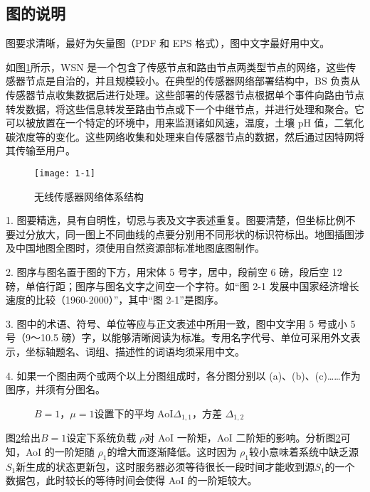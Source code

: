 \subsection{图的说明}

图要求清晰，最好为矢量图（PDF 和 EPS 格式），图中文字最好用中文。

如图\ref{Fig1-1}所示，WSN 是一个包含了传感节点和路由节点两类型节点的网络，这些传感器节点是自治的，并且规模较小。在典型的传感器网络部署结构中，BS 负责从传感器节点收集数据后进行处理。这些部署的传感器节点根据单个事件向路由节点转发数据，将这些信息转发至路由节点或下一个中继节点，并进行处理和聚合。它可以被放置在一个特定的环境中，用来监测诸如风速，温度，土壤 pH 值，二氧化碳浓度等的变化。这些网络收集和处理来自传感器节点的数据，然后通过因特网将其传输至用户。

\begin{figure}[htbp]
\vspace*{6pt}
\centering
\texttt{[image: 1-1]}
\caption{无线传感器网络体系结构}\label{Fig1-1}
\vspace*{10pt}
\end{figure}


\textcolor[rgb]{1.00,0.00,0.00}{1. 图要精选，具有自明性，切忌与表及文字表述重复。图要清楚，但坐标比例不要过分放大，同一图上不同曲线的点要分别用不同形状的标识符标出。地图插图涉及中国地图全图时，须使用自然资源部标准地图底图制作。}

\textcolor[rgb]{1.00,0.00,0.00}{2. 图序与图名置于图的下方，用宋体 5 号字，居中，段前空 6 磅，段后空 12 磅，单倍行距；图序与图名文字之间空一个字符。如“图 2-1 发展中国家经济增长速度的比较（1960-2000）”，其中“图 2-1”是图序。}

\textcolor[rgb]{1.00,0.00,0.00}{3. 图中的术语、符号、单位等应与正文表述中所用一致，图中文字用 5 号或小 5 号（9～10.5 磅）字，以能够清晰阅读为标准。专用名字代号、单位可采用外文表示，坐标轴题名、词组、描述性的词语均须采用中文。}

\textcolor[rgb]{1.00,0.00,0.00}{4. 如果一个图由两个或两个以上分图组成时，各分图分别以 (a)、(b)、(c)……作为图序，并须有分图名。}


\begin{figure}[htbp]
	\vspace*{6pt}
	\centering
	\subfigure[ ${\rho _1} + {\rho _2} = 3$ ]{\label{fig:subfig:1-2a}
		\texttt{[image: 1-2a]}}
	\vspace{1pt}
	\subfigure[${\rho _1} + {\rho _2} = 4$]{\label{fig:subfig:1-2b}
		\texttt{[image: 1-2b]}}
	\caption{$B = 1$，$\mu  = 1$设置下的平均 AoI${\Delta _{1,1}}$，方差 ${\Delta _{1,2}}$}\label{Fig1-2}
	\vspace*{10pt}
\end{figure}
图\ref{Fig1-2}给出$B = 1$设定下系统负载 $\rho$对 AoI 一阶矩，AoI 二阶矩的影响。分析图\ref{Fig1-2}可知，AoI 的一阶矩随 ${\rho_1}$的增大而逐渐降低。这时因为 ${\rho _1}$较小意味着系统中缺乏源${S_1}$新生成的状态更新包，这时服务器必须等待很长一段时间才能收到源${S_1}$的一个数据包，此时较长的等待时间会使得 AoI 的一阶矩较大。



